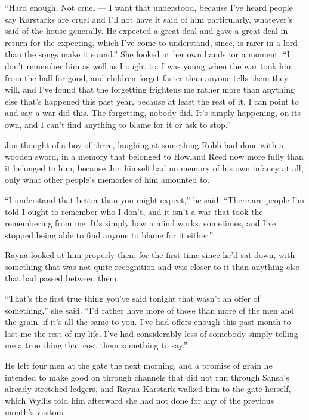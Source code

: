 “Hard enough. Not cruel — I want that understood, because I’ve heard people say Karstarks are cruel and I’ll not have it said of him particularly, whatever’s said of the house generally. He expected a great deal and gave a great deal in return for the expecting, which I’ve come to understand, since, is rarer in a lord than the songs make it sound.” She looked at her own hands for a moment. “I don’t remember him as well as I ought to. I was young when the war took him from the hall for good, and children forget faster than anyone tells them they will, and I’ve found that the forgetting frightens me rather more than anything else that’s happened this past year, because at least the rest of it, I can point to and say a war did this. The forgetting, nobody did. It’s simply happening, on its own, and I can’t find anything to blame for it or ask to stop.”

Jon thought of a boy of three, laughing at something Robb had done with a wooden sword, in a memory that belonged to Howland Reed now more fully than it belonged to him, because Jon himself had no memory of his own infancy at all, only what other people’s memories of him amounted to.

“I understand that better than you might expect,” he said. “There are people I’m told I ought to remember who I don’t, and it isn’t a war that took the remembering from me. It’s simply how a mind works, sometimes, and I’ve stopped being able to find anyone to blame for it either.”

Rayna looked at him properly then, for the first time since he’d sat down, with something that was not quite recognition and was closer to it than anything else that had passed between them.

“That’s the first true thing you’ve said tonight that wasn’t an offer of something,” she said. “I’d rather have more of those than more of the men and the grain, if it’s all the same to you. I’ve had offers enough this past month to last me the rest of my life. I’ve had considerably less of somebody simply telling me a true thing that cost them something to say.”

\sceneBreak

He left four men at the gate the next morning, and a promise of grain he intended to make good on through channels that did not run through Sansa’s already-stretched ledgers, and Rayna Karstark walked him to the gate herself, which Wyllis told him afterward she had not done for any of the previous month’s visitors.

